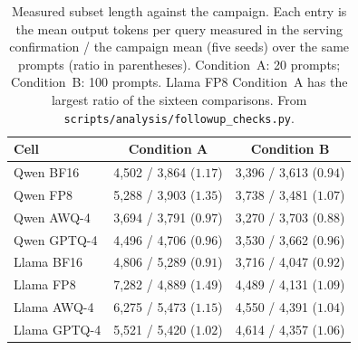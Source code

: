 \documentclass[11pt,a4paper]{article}
\begin{document}
\begin{table}[t]
\centering
\caption{Measured subset length against the campaign. Each entry is the mean output tokens per query measured in the serving confirmation / the campaign mean (five seeds) over the same prompts (ratio in parentheses). Condition~A: 20 prompts; Condition~B: 100 prompts. Llama FP8 Condition~A has the largest ratio of the sixteen comparisons. From \texttt{scripts/analysis/followup\_checks.py}.}
\label{tab:subsetlen}
\small
\begin{tabular}{lcc}
\toprule
\textbf{Cell} & \textbf{Condition A} & \textbf{Condition B} \\
\midrule
Qwen BF16 & 4{,}502 / 3{,}864 ($1.17$) & 3{,}396 / 3{,}613 ($0.94$) \\
Qwen FP8 & 5{,}288 / 3{,}903 ($1.35$) & 3{,}738 / 3{,}481 ($1.07$) \\
Qwen AWQ-4 & 3{,}694 / 3{,}791 ($0.97$) & 3{,}270 / 3{,}703 ($0.88$) \\
Qwen GPTQ-4 & 4{,}496 / 4{,}706 ($0.96$) & 3{,}530 / 3{,}662 ($0.96$) \\
\midrule
Llama BF16 & 4{,}806 / 5{,}289 ($0.91$) & 3{,}716 / 4{,}047 ($0.92$) \\
Llama FP8 & 7{,}282 / 4{,}889 ($1.49$) & 4{,}489 / 4{,}131 ($1.09$) \\
Llama AWQ-4 & 6{,}275 / 5{,}473 ($1.15$) & 4{,}550 / 4{,}391 ($1.04$) \\
Llama GPTQ-4 & 5{,}521 / 5{,}420 ($1.02$) & 4{,}614 / 4{,}357 ($1.06$) \\
\bottomrule
\end{tabular}
\end{table}
\end{document}
